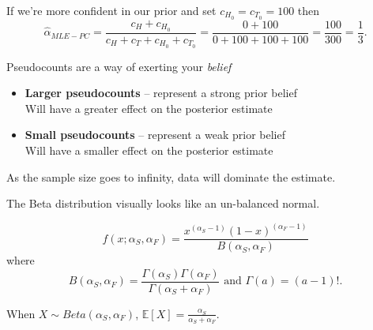 If we're more confident in our prior and set  $c_{H_0}=c_{T_0}=100$ then
\[\hat\alpha_{MLE-PC} = \frac{c_H+c_{H_0}}{c_H+c_T+c_{H_0}+c_{T_0}}=\frac{0+100}{0+100+100+100} = \frac{100}{300} = \frac{1}{3}.\]

Pseudocounts are a way of exerting your \textit{belief}
\begin{itemize}
\item[] \textbf{Larger pseudocounts} – represent a strong prior belief\\\hspace*{3em}
Will have a greater effect on the posterior estimate
\item[] \textbf{Small pseudocounts} – represent a weak prior belief\\\hspace*{3em}
Will have a smaller effect on the posterior estimate
\end{itemize}

As the sample size goes to infinity, data will dominate the estimate.

\begin{aside}
The Beta distribution visually looks like an un-balanced normal. 

\begin{center}
\end{center}

\[f(x;\alpha_S, \alpha_F) = \frac{x^{(\alpha_S-1)}(1-x)^{(\alpha_F-1)}}{B(\alpha_S,\alpha_F)}\]
where 
\[B(\alpha_S,\alpha_F) = \frac{\Gamma(\alpha_S)\Gamma(\alpha_F)}{\Gamma(\alpha_S+\alpha_F)}\text{ and } \Gamma(a) = (a-1)!.\]

When $X\sim Beta(\alpha_S, \alpha_F)$, $\mathbb{E}[X] = \frac{\alpha_S}{\alpha_S + \alpha_F}$.

\end{aside}

